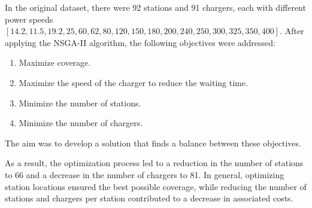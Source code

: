 In the original dataset, there were 92 stations and 91 chargers, each with different power speeds \([14.2, 11.5, 19.2, 25, 60, 62, 80, 120, 150, 180, 200, 240, 250, 300, 325, 350, 400]\). After applying the NSGA-II algorithm, the following objectives were addressed:

\begin{enumerate}
    \item Maximize coverage.
    \item Maximize the speed of the charger to reduce the waiting time.
    \item Minimize the number of stations.
    \item Minimize the number of chargers.
\end{enumerate}

The aim was to develop a solution that finds a balance between these objectives.

As a result, the optimization process led to a reduction in the number of stations to 66 and a decrease in the number of chargers to 81. In general, optimizing station locations ensured the best possible coverage, while reducing the number of stations and chargers per station contributed to a decrease in associated costs.
